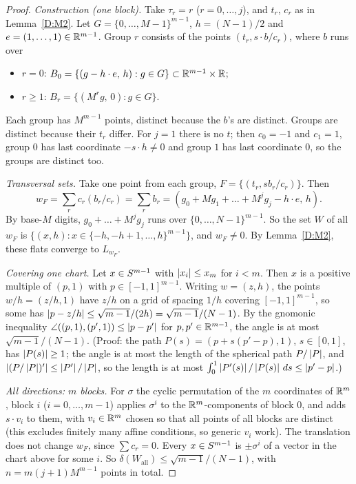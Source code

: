 \begin{proof}
\emph{Construction (one block).} Take $\tau_r=r$ ($r=0,\dots,j$), and $t_r$, $c_r$ as in
Lemma~\ref{D:M2}. Let $G=\{0,\dots,M-1\}^{m-1}$, $h=(N-1)/2$ and $e=(1,\dots,1)\in\mathbb{R}^{m-1}$. Group
$r$ consists of the points $(t_r,s\cdot b/c_r)$, where $b$ runs over
\begin{itemize}
  \item $r=0$: $B_0=\{(g-h\cdot e,\,h):g\in G\}\subset\mathbb{R}^{m-1}\times\mathbb{R}$;
  \item $r\ge1$: $B_r=\{(M^rg,\,0):g\in G\}$.
\end{itemize}
Each group has $M^{m-1}$ points, distinct because the $b$'s are distinct. Groups are distinct
because their $t_r$ differ. For $j=1$ there is no $t$; then $c_0=-1$ and $c_1=1$, group $0$ has last
coordinate $-s\cdot h\ne0$ and group $1$ has last coordinate $0$, so the groups are distinct too.

\emph{Transversal sets.} Take one point from each group, $F=\{(t_r,sb_r/c_r)\}$. Then
\[
  w_F=\sum_rc_r(b_r/c_r)=\sum_rb_r=(g_0+Mg_1+\dots+M^jg_j-h\cdot e,\,h).
\]
By base-$M$ digits, $g_0+\dots+M^jg_j$ runs over $\{0,\dots,N-1\}^{m-1}$. So the set $W$ of all
$w_F$ is $\{(x,h):x\in\{-h,-h+1,\dots,h\}^{m-1}\}$, and $w_F\ne0$. By Lemma~\ref{D:M2}, these flats
converge to $L_{w_F}$.

\emph{Covering one chart.} Let $x\in S^{m-1}$ with $\left|x_i\right|\le x_m$ for $i<m$. Then $x$ is a
positive multiple of $(p,1)$ with $p\in[-1,1]^{m-1}$. Writing $w=(z,h)$, the points
$w/h=(z/h,1)$ have $z/h$ on a grid of spacing $1/h$ covering $[-1,1]^{m-1}$, so some has
$\left|p-z/h\right|\le\sqrt{m-1}/(2h)=\sqrt{m-1}/(N-1)$. By the gnomonic inequality
$\angle((p,1),(p',1))\le\left|p-p'\right|$ for $p,p'\in\mathbb{R}^{m-1}$, the angle is at most $\sqrt{m-1}/(N-1)$.
(Proof: the path $P(s)=(p+s(p'-p),1)$, $s\in[0,1]$, has $\left|P(s)\right|\ge1$; the angle is at most the
length of the spherical path $P/\left|P\right|$, and $\left|(P/\left|P\right|)'\right|\le\left|P'\right|/\left|P\right|$, so the length is at
most $\int_0^1\left|P'(s)\right|/\left|P(s)\right|\,ds\le\left|p'-p\right|$.)

\emph{All directions: $m$ blocks.} For $\sigma$ the cyclic permutation of the $m$ coordinates of
$\mathbb{R}^m$, block $i$ ($i=0,\dots,m-1$) applies $\sigma^i$ to the $\mathbb{R}^m$-components of block $0$, and
adds $s\cdot v_i$ to them, with $v_i\in\mathbb{R}^m$ chosen so that all points of all blocks are distinct
(this excludes finitely many affine conditions, so generic $v_i$ work). The translation does not
change $w_F$, since $\sum c_r=0$. Every $x\in S^{m-1}$ is $\pm\sigma^i$ of a vector in the chart
above for some $i$. So $\delta(W_{\mathrm{all}})\le\sqrt{m-1}/(N-1)$, with $n=m(j+1)M^{m-1}$ points
in total.


\end{proof}
